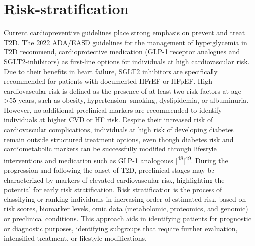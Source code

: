 \documentclass[
  a4paper,
  headsepline=true,
  open=any]{scrbook}
\begin{document}
\hypertarget{risk-stratification}{%
\section{Risk-stratification}\label{risk-stratification}}

Current cardiopreventive guidelines place strong emphasis on prevent and
treat T2D. The 2022 ADA/EASD guidelines for the management of
hyperglycemia in T2D recommend, cardioprotective medication (GLP-1
receptor analogues and SGLT2-inhibitors) as first-line options for
individuals at high cardiovascular risk. Due to their benefits in heart
failure, SGLT2 inhibitors are specifically recommended for patients with
documented HFrEF or HFpEF. High cardiovascular risk is defined as the
presence of at least two risk factors at age \textgreater55 years, such
as obesity, hypertension, smoking, dyslipidemia, or albuminuria.
However, no additional preclinical markers are recommended to identify
individuals at higher CVD or HF risk. Despite their increased risk of
cardiovascular complications, individuals at high risk of developing
diabetes remain outside structured treatment options, even though
diabetes risk and cardiometabolic markers can be successfully modified
through lifestyle interventions and medication such as GLP-1 analogoues
{[}\textsuperscript{48}{]}\textsuperscript{49}. During the progression
and following the onset of T2D, preclinical stages may be characterized
by markers of elevated cardiovascular risk, highlighting the potential
for early risk stratification. Risk stratification is the process of
classifying or ranking individuals in increasing order of estimated
risk, based on risk scores, biomarker levels, omic data (metabolomic,
proteomics, and genomic) or preclinical conditions. This approach aids
in identifying patients for prognostic or diagnostic purposes,
identifying subgroups that require further evaluation, intensified
treatment, or lifestyle modifications.
\end{document}
